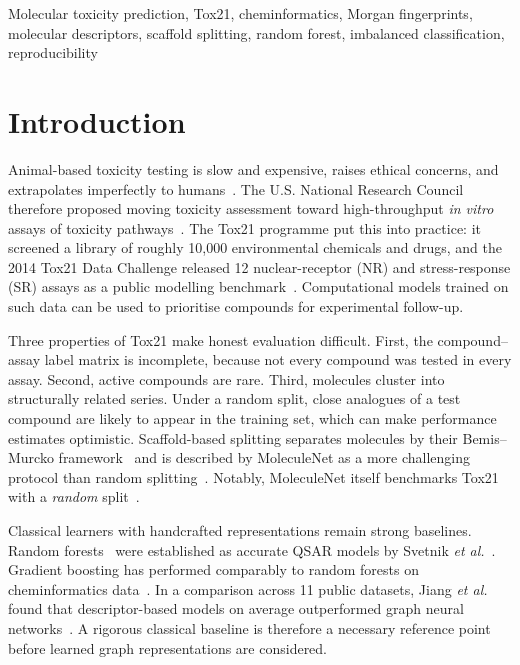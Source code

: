 \documentclass[conference]{IEEEtran}
\begin{document}
\begin{IEEEkeywords}
Molecular toxicity prediction, Tox21, cheminformatics, Morgan fingerprints, molecular descriptors, scaffold splitting, random forest, imbalanced classification, reproducibility
\end{IEEEkeywords}

\section{Introduction}
Animal-based toxicity testing is slow and expensive, raises ethical concerns, and extrapolates imperfectly to humans~\cite{hartung2009toxicology}. The U.S. National Research Council therefore proposed moving toxicity assessment toward high-throughput \textit{in vitro} assays of toxicity pathways~\cite{nrc2007toxicity}. The Tox21 programme put this into practice: it screened a library of roughly 10,000 environmental chemicals and drugs, and the 2014 Tox21 Data Challenge released 12 nuclear-receptor (NR) and stress-response (SR) assays as a public modelling benchmark~\cite{huang2016tox21}. Computational models trained on such data can be used to prioritise compounds for experimental follow-up.

Three properties of Tox21 make honest evaluation difficult. First, the compound--assay label matrix is incomplete, because not every compound was tested in every assay. Second, active compounds are rare. Third, molecules cluster into structurally related series. Under a random split, close analogues of a test compound are likely to appear in the training set, which can make performance estimates optimistic. Scaffold-based splitting separates molecules by their Bemis--Murcko framework~\cite{bemis1996frameworks} and is described by MoleculeNet as a more challenging protocol than random splitting~\cite{wu2018moleculenet}. Notably, MoleculeNet itself benchmarks Tox21 with a \emph{random} split~\cite{wu2018moleculenet}.

Classical learners with handcrafted representations remain strong baselines. Random forests~\cite{breiman2001random} were established as accurate QSAR models by Svetnik \textit{et al.}~\cite{svetnik2003random}. Gradient boosting has performed comparably to random forests on cheminformatics data~\cite{svetnik2005boosting}. In a comparison across 11 public datasets, Jiang \textit{et al.} found that descriptor-based models on average outperformed graph neural networks~\cite{jiang2021could}. A rigorous classical baseline is therefore a necessary reference point before learned graph representations are considered.
\end{document}
